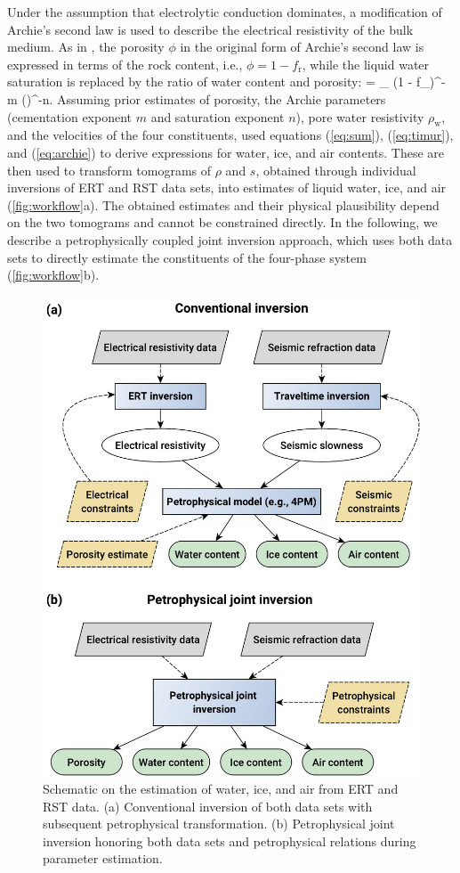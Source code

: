 \documentclass[extra]{gji}
\let\oldequation\equation
\let\oldendequation\endequation
\renewenvironment{equation}
  {\linenomathNonumbers\oldequation}
  {\oldendequation\endlinenomath}
\begin{document}
Under the assumption that electrolytic conduction dominates, a modification of Archie's second law \citep{Archie1942} is used to describe the electrical resistivity of the bulk medium.
As in \cite{Hauck2011}, the porosity $\phi$ in the original form of Archie's second law is expressed in terms of the rock content, i.e., $\phi = 1-f_\text{r}$, while the liquid water saturation is replaced by the ratio of water content and porosity:
%
\begin{equation}\label{eq:archie}
 \rho= \rho_ (1 - f_)^{- m} \left(\right)^{-n}.
\end{equation}
%
Assuming prior estimates of porosity, the Archie parameters (cementation exponent $m$ and saturation exponent $n$), pore water resistivity $\rho_\text{w}$, and the velocities of the four constituents, \cite{Hauck2011} used equations (\ref{eq:sum}), (\ref{eq:timur}), and (\ref{eq:archie}) to derive expressions for water, ice, and air contents.
These are then used to transform tomograms of $\rho$ and $s$, obtained through individual inversions of ERT and RST data sets, into estimates of liquid water, ice, and air (\autoref{fig:workflow}a).
The obtained estimates and their physical plausibility depend on the two tomograms and cannot be constrained directly. In the following, we describe a petrophysically coupled joint inversion approach, which uses both data sets to directly estimate the constituents of the four-phase system (\autoref{fig:workflow}b).

\begin{figure}
 \centering
 \includegraphics[width=.5\textwidth]{./Fig1_one_column}
 \caption{Schematic on the estimation of water, ice, and air from ERT and RST data.
  (a) Conventional inversion of both data sets with subsequent petrophysical transformation.
  (b) Petrophysical joint inversion honoring both data sets and petrophysical relations during parameter estimation.
 }
 \label{fig:workflow}
\end{figure}
\end{document}

